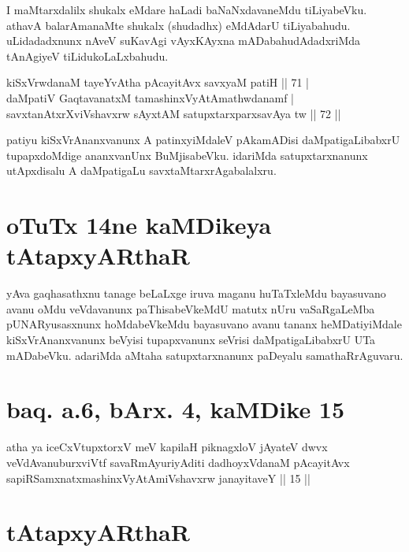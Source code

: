 \begin{artha}
I maMtarxdalilx shukalx eMdare haLadi baNaNxdavaneMdu tiLiyabeVku. athavA balarAmanaMte shukalx (shudadhx) eMdAdarU tiLiyabahudu. uLidadadxnunx nAveV suKavAgi vAyxKAyxna mADabahudAdadxriMda tAnAgiyeV tiLidukoLaLxbahudu.
\end{artha}


\begin{shl}
kiSxVrwdanaM tayeYvAtha pAcayitAvx savxyaM patiH \hfill|| 71 | \\
daMpatiV GaqtavanatxM tamashinxVyAtAmathwdanamf | \\
savxtanAtxrXviVshavxrw sAyxtAM satupxtarxparxsavAya tw \hfill|| 72 || 
\end{shl}

\begin{artha}
patiyu kiSxVrAnanxvanunx A patinxyiMdaleV pAkamADisi daMpatigaLibabxrU tupapxdoMdige ananxvanUnx BuMjisabeVku. idariMda satupxtarxnanunx utApxdisalu A daMpatigaLu savxtaMtarxrAgabalalxru.
\end{artha}

\section*{oTuTx 14ne kaMDikeya tAtapxyARthaR}

\begin{artha}
yAva gaqhasathxnu tanage beLaLxge iruva maganu huTaTxleMdu bayasuvano avanu oMdu veVdavanunx paThisabeVkeMdU matutx nUru vaSaRgaLeMba pUNARyusasxnunx hoMdabeVkeMdu bayasuvano avanu tananx heMDatiyiMdale kiSxVrAnanxvanunx beVyisi tupapxvanunx seVrisi daMpatigaLibabxrU UTa mADabeVku. adariMda aMtaha satupxtarxnanunx paDeyalu samathaRrAguvaru.
\end{artha}

\section*{baq. a.6, bArx. 4, kaMDike 15}

\begin{shl}
atha ya iceCxVtupxtorxV meV kapilaH piknagxloV jAyateV dwvx veVdAvanuburxviVtf savaRmAyuriyAditi dadhoyxVdanaM pAcayitAvx sapiRSamxnatxmashinxVyAtAmiVshavxrw janayitaveY || 15 ||
\end{shl}

\section*{tAtapxyARthaR}

